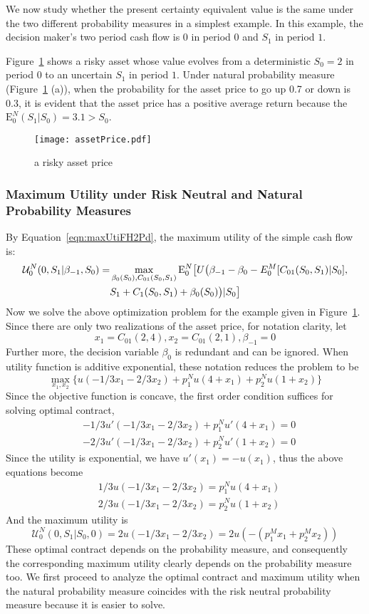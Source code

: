 \documentclass{article}[12pt letter]
\newcommand{\E}{\mathrm{E}}
\begin{document}
We now study whether the present certainty equivalent value is the same under the two different probability measures in a simplest example. In this example, the decision maker's two period cash flow is $0$ in period $0$ and $S_1$ in period $1$.

Figure~\ref{assetPrice} shows a risky asset whose value evolves from a deterministic $S_0=2$ in period $0$ to an uncertain $S_1$ in period $1$. Under natural probability measure (Figure~\ref{assetPrice} (a)), when the probability for the asset price to go up 0.7 or down is 0.3,  it is evident that the asset price has a positive average return because the $\E_0^N (S_1|S_0) = 3.1 > S_0$.  

\begin{figure}
\texttt{[image: assetPrice.pdf]}\newline
\caption{a risky asset price}%
\label{assetPrice}%
\end{figure}
\bigskip
\subsubsection{ Maximum Utility under Risk Neutral and Natural Probability Measures}

By Equation~\ref{eqn:maxUtiFH2Pd}, the maximum utility of the simple cash flow is:
\begin{align*}
\mathcal{U}^N_0 (0, S_1|\beta_{-1},S_0) = &\max_{\beta_0(S_0), C_{01}(S_0,S_1)} \E_0^N \big{[}U\big{(}\beta_{-1} - \beta_0 - E_0^M[C_{01}(S_0,S_1)|S_0], 
\\&S_1+ C_1(S_0,S_1) + \beta_0(S_0)\big{)}|S_0\big{]}
\end{align*}
Now we solve the above optimization problem for the example given in Figure~\ref{assetPrice}. Since there are only two realizations of the asset price, for notation clarity, let
\[ x_1 = C_{01}(2,4), x_2 = C_{01}(2,1), \beta_{-1} = 0 \]
Further more, the decision variable $\beta_0$ is redundant and can be ignored. When utility function is additive exponential, these notation reduces the problem to be
\[ \max_{x_1,x_2} \{ u(-1/3 x_1 - 2/3 x_2) + p_1^Nu(4+x_1) + p_2^Nu(1+x_2)\}\]
Since the objective function is concave, the first order condition suffices for solving optimal contract,
\begin{align}
&-1/3u'(-1/3x_1-2/3 x_2) + p_1^Nu'(4+x_1) = 0\\
&-2/3u'(-1/3x_1-2/3 x_2) + p_2^Nu'(1+x_2) = 0
\end{align}
Since the utility is exponential, we have $u'(x_1) =-u(x_1)$, thus the above equations become
\begin{align}
&1/3u(-1/3x_1-2/3 x_2) = p_1^Nu(4+x_1)\\
&2/3u(-1/3x_1-2/3 x_2) = p_2^Nu(1+x_2) 
\end{align}
And the maximum utility is 
\[\mathcal{U}^N_0(0, S_1|S_0,0) = 2u(-1/3x_1-2/3x_2) = 2u(-(p_1^M x_1+p_2^M x_2)) \]
These optimal contract depends on the probability measure, and consequently the corresponding maximum utility clearly depends on the probability measure too.  We first proceed to analyze the optimal contract and maximum utility when the natural probability measure coincides with the risk neutral probability measure because it is easier to solve. 
\end{document}
